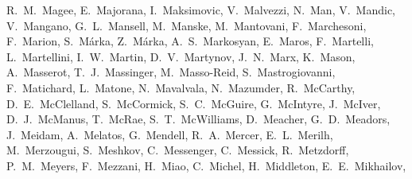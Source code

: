 {R.~M.~Magee,  %
E.~Majorana, %
I.~Maksimovic, %
V.~Malvezzi, %
N.~Man, %
V.~Mandic,  %
V.~Mangano,  %
G.~L.~Mansell,  %
M.~Manske,  %
M.~Mantovani, %
F.~Marchesoni, %
F.~Marion, %
S.~M\'arka,  %
Z.~M\'arka,  %
A.~S.~Markosyan,  %
E.~Maros,  %
F.~Martelli, %
L.~Martellini, %
I.~W.~Martin,  %
D.~V.~Martynov,  %
J.~N.~Marx,  %
K.~Mason,  %
A.~Masserot, %
T.~J.~Massinger,  %
M.~Masso-Reid,  %
S.~Mastrogiovanni, %
F.~Matichard,  %
L.~Matone,  %
N.~Mavalvala,  %
N.~Mazumder,  %
R.~McCarthy,  %
D.~E.~McClelland,  %
S.~McCormick,  %
S.~C.~McGuire,  %
G.~McIntyre,  %
J.~McIver,  %
D.~J.~McManus,  %
T.~McRae,  %
S.~T.~McWilliams,  %
D.~Meacher, %
G.~D.~Meadors,  %
J.~Meidam, %
A.~Melatos,  %
G.~Mendell,  %
R.~A.~Mercer,  %
E.~L.~Merilh,  %
M.~Merzougui, %
S.~Meshkov,  %
C.~Messenger,  %
C.~Messick,  %
R.~Metzdorff, %
P.~M.~Meyers,  %
F.~Mezzani, %
H.~Miao,  %
C.~Michel, %
H.~Middleton,  %
E.~E.~Mikhailov,  %
}
